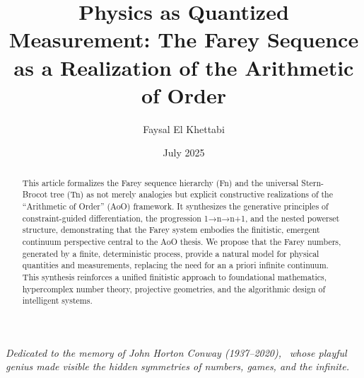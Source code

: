 \documentclass[12pt,a4paper]{article}
\title{Physics as Quantized Measurement: The Farey Sequence as a Realization of the Arithmetic of Order}
\author{Faysal El Khettabi}
\affil{Ensemble AIs\ \texttt{faysal.el.khettabi@gmail.com}}
\date{July 2025}
\theoremstyle{definition}
\theoremstyle{remark}
\begin{document}
\maketitle
\begin{center}
\vspace{1em}
\emph{Dedicated to the memory of John Horton Conway (1937–2020),} \
\emph{whose playful genius made visible the hidden symmetries of numbers, games, and the infinite.}
\vspace{1em}
\end{center}
\tableofcontents
\begin{abstract}
This article formalizes the Farey sequence hierarchy (Fn​) and the universal Stern-Brocot tree (Tn​) as not merely analogies but explicit constructive realizations of the ``Arithmetic of Order'' (AoO) framework. It synthesizes the generative principles of constraint-guided differentiation, the progression 1→n→n+1, and the nested powerset structure, demonstrating that the Farey system embodies the finitistic, emergent continuum perspective central to the AoO thesis. We propose that the Farey numbers, generated by a finite, deterministic process, provide a natural model for physical quantities and measurements, replacing the need for an a priori infinite continuum. This synthesis reinforces a unified finitistic approach to foundational mathematics, hypercomplex number theory, projective geometries, and the algorithmic design of intelligent systems.
\end{abstract}
\end{document}
